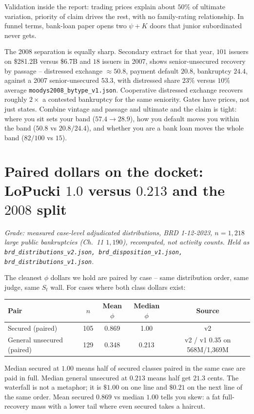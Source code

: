 Validation inside the report: trading prices explain about $50\%$ of ultimate variation, priority of claim drives the rest, with no family-rating relationship. In funnel terms, bank-loan paper opens two $\psi+K$ doors that junior subordinated never gets.

The 2008 separation is equally sharp. Secondary extract for that year, $101$ issuers on \$281.2B versus \$6.7B and $18$ issuers in 2007, shows senior-unsecured recovery by passage -- distressed exchange $\approx 50.8$, payment default $20.8$, bankruptcy $24.4$, against a 2007 senior-unsecured $53.3$, with distressed share $23\%$ versus $10\%$ average \texttt{moodys2008\_bytype\_v1.json}. Cooperative distressed exchange recovers roughly $2\times$ a contested bankruptcy for the same seniority. Gates have prices, not just states. Combine vintage and passage and ultimate and the claim is tight: where you sit sets your band ($57.4\to28.9$), how you default moves you within the band ($50.8$ vs $20.8/24.4$), and whether you are a bank loan moves the whole band ($82/100$ vs $15$).

\section{Paired dollars on the docket: LoPucki $1.0$ versus $0.213$ and the $2008$ split}
\label{sec:lopucki}

\textit{Grade: measured case-level adjudicated distributions, BRD 1-12-2023, $n=1{,}218$ large public bankruptcies (Ch.~11 $1{,}190$), recomputed, not activity counts. Held as \texttt{brd\_distributions\_v2.json, brd\_disposition\_v1.json, brd\_distributions\_v1.json}.}

The cleanest $\phi$ dollars we hold are paired by case -- same distribution order, same judge, same $S_t$ wall. For cases where both class dollars exist:

\begin{center}
\small
\begin{tabular}{lcccc}
\toprule
Pair & $n$ & Mean $\phi$ & Median $\phi$ & Source \\
\midrule
Secured (paired) & 105 & 0.869 & 1.00 & v2 \\
General unsecured (paired) & 129 & 0.348 & 0.213 & v2 / v1 0.35 on 568M/1,369M \\
\bottomrule
\end{tabular}
\end{center}

Median secured at $1.00$ means half of secured classes paired in the same case are paid in full. Median general unsecured at $0.213$ means half get $21.3$ cents. The waterfall is not a metaphor; it is $\$1.00$ on one line and $\$0.21$ on the next line of the same order. Mean secured $0.869$ vs median $1.00$ tells you skew: a fat full-recovery mass with a lower tail where even secured takes a haircut.

